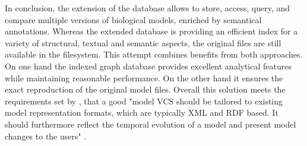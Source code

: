 In conclusion, the extension of the \masymos database allows to store, access, query, and compare multiple versions of biological models, enriched by semantical annotations. Whereas the extended \masymos database is providing an efficient index for a variety of structural, textual and semantic aspects, the original files are still available in the filesystem.
This attempt combines benefits from both approaches.
On one hand the indexed graph database provides excellent analytical features while maintaining reasonable performance. On the other hand it ensures the exact reproduction of the original model files.
Overall this solution meets the requirements set by \citet{Waltemath2013}, that a good "model VCS should be tailored to existing model  representation formats, which are typically XML and RDF based. It should furthermore reflect the temporal evolution of a model and present model changes to the users" \citep{Waltemath2013}.

 
\begin{comment}
\todo{what's done from the concept}
\todo{still high-level}
\todo{what problem is solved?}

\begin{itemize}
	\item implemented db concept
		\subitem picture from simple-sbml-demo
		\subitem rest of pictures in appendix
	\item Ontology import
		\subitem changes to \masymos core
		\subitem using existing import mechanics, but dynamic
	\item http server storage concept?
\end{itemize}

solved:
"A model VCS should be tailored to existing model representation formats, which are typically XML and RDF based. It should furthermore reflect the temporal evolution of a model and present model changes to the users." \citep{Waltemath2013}

The objective of this thesis is therefore to investigate into a concept to store systems biology models in a way, that multiple versions can be accessed, queried, and compared. Further, semantical annotations of changes between these versions shall be introduced. These additional relations are meant to improve the ability to query for a version of a model by specific criteria and consequently improving the user experience for biologists seeking to build onto existing models, as the evolution of them plays an important role for them \citep{Scharm2015}
\end{comment}

